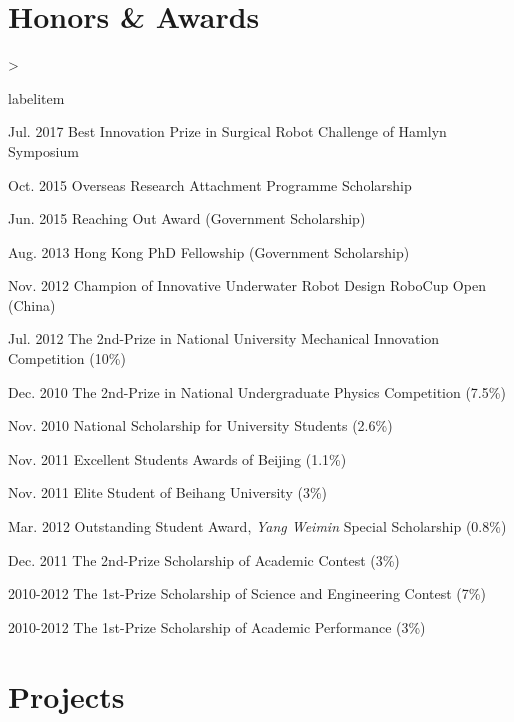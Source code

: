 \documentclass[10pt,letterpaper]{article}
\makeatletter
\newenvironment{dateitemize}%
{\ifnum \@itemdepth >\thr@@\@toodeep\else
\advance\@itemdepth\@ne
\edef\@itemitem{labelitem\romannumeral\the\@itemdepth}%
\expandafter
\list
\csname\@itemitem\endcsname
{\advance\rightmargin3cm
\def\makelabel##1{\hss\llap{\textbullet}\rlap{\hbox to \dimexpr\linewidth+\rightmargin+\itemsep\relax{\hss##1}}}}%
\fi}
{\endlist}%
\makeatother
\begin{document}
\section*{Honors \& Awards}

\begin{dateitemize}
    \item[Jul. 2017] Best Innovation Prize in Surgical Robot Challenge of Hamlyn Symposium
    \item[Oct. 2015] Overseas Research Attachment Programme Scholarship
    \item[Jun. 2015] Reaching Out Award (Government Scholarship)
    \item[Aug. 2013] Hong Kong PhD Fellowship (Government Scholarship)
    \item[Nov. 2012] Champion of Innovative Underwater Robot Design RoboCup Open (China)
    \item[Jul. 2012] The 2nd-Prize in National University Mechanical Innovation Competition (10\%)
    \item[Dec. 2010] The 2nd-Prize in National Undergraduate Physics Competition (7.5\%)
    \item[Nov. 2010] National Scholarship for University Students (2.6\%)
    \item[Nov. 2011] Excellent Students Awards of Beijing (1.1\%)
    \item[Nov. 2011] Elite Student of Beihang University (3\%)
    \item[Mar. 2012] Outstanding Student Award, \textit{Yang Weimin} Special Scholarship (0.8\%)
    \item[Dec. 2011] The 2nd-Prize Scholarship of Academic Contest (3\%)
    \item[2010-2012] The 1st-Prize Scholarship of Science and Engineering Contest (7\%)
    \item[2010-2012] The 1st-Prize Scholarship of Academic Performance (3\%)

\end{dateitemize}

\section*{Projects}
\end{document}
